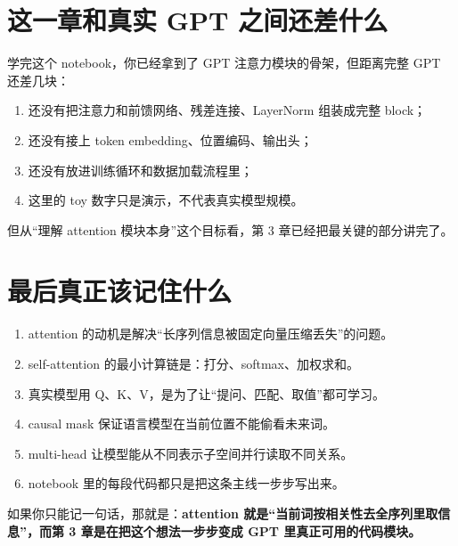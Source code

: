 \documentclass[11pt,a4paper]{ctexart}
\begin{document}
\section{这一章和真实 GPT 之间还差什么}

学完这个 notebook，你已经拿到了 GPT 注意力模块的骨架，但距离完整 GPT 还差几块：

\begin{enumerate}
  \item 还没有把注意力和前馈网络、残差连接、LayerNorm 组装成完整 block；
  \item 还没有接上 token embedding、位置编码、输出头；
  \item 还没有放进训练循环和数据加载流程里；
  \item 这里的 toy 数字只是演示，不代表真实模型规模。
\end{enumerate}

但从“理解 attention 模块本身”这个目标看，第 3 章已经把最关键的部分讲完了。

\section{最后真正该记住什么}

\begin{enumerate}
  \item attention 的动机是解决“长序列信息被固定向量压缩丢失”的问题。
  \item self-attention 的最小计算链是：打分、softmax、加权求和。
  \item 真实模型用 Q、K、V，是为了让“提问、匹配、取值”都可学习。
  \item causal mask 保证语言模型在当前位置不能偷看未来词。
  \item multi-head 让模型能从不同表示子空间并行读取不同关系。
  \item notebook 里的每段代码都只是把这条主线一步步写出来。
\end{enumerate}

\begin{keypointblock}
如果你只能记一句话，那就是：\textbf{attention 就是“当前词按相关性去全序列里取信息”，而第 3 章是在把这个想法一步步变成 GPT 里真正可用的代码模块。}
\end{keypointblock}
\end{document}
